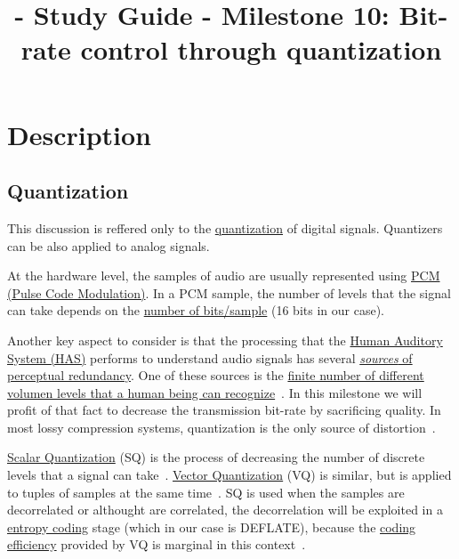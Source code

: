 
\title{\TM{} - Study Guide - Milestone 10: Bit-rate control through quantization}

\maketitle

\section{Description}

\subsection{Quantization}
This discussion is reffered only to the
\href{https://en.wikipedia.org/wiki/Quantization_(signal_processing)}{quantization}
of digital signals. Quantizers can be also applied to analog signals.

At the hardware level, the samples of audio are usually represented
using \href{https://en.wikipedia.org/wiki/Pulse-code_modulation}{PCM
  (Pulse Code Modulation)}. In a PCM sample, the number of levels that
the signal can take depends on the
\href{https://en.wikipedia.org/wiki/Audio_bit_depth}{number of
  bits/sample} (16 bits in our case).

Another key aspect to consider is that the processing that the
\href{https://en.wikipedia.org/wiki/Auditory_system}{Human Auditory
  System (HAS)} performs to understand audio signals has several
\href{https://en.wikipedia.org/wiki/Psychoacoustics}{\emph{sources} of
  perceptual redundancy}. One of these sources is the
\href{https://en.wikipedia.org/wiki/Equal-loudness_contour}{finite
  number of different volumen levels that a human being can
  recognize}~\cite{bosi2003intro}. In this milestone we will profit of
that fact to decrease the transmission bit-rate by sacrificing
quality.  In most lossy compression systems, quantization is the only
source of distortion~\cite{taubman2002jpeg2000}.

\href{https://en.wikipedia.org/wiki/Quantization_(signal_processing)}{Scalar
  Quantization} (SQ) is the process of decreasing the number of
discrete levels that a signal can
take~\cite{sayood2017introduction}. \href{https://en.wikipedia.org/wiki/Vector_quantization}{Vector
Quantization} (VQ) is similar, but is applied to tuples of samples at
the same time~\cite{vetterli2014foundations}. SQ is used when the
samples are decorrelated or althought are correlated, the decorrelation
will be exploited in
a \href{https://en.wikipedia.org/wiki/Entropy_encoding}{entropy
coding} stage (which in our case is DEFLATE), because the
\href{https://en.wikipedia.org/wiki/Quantization_(signal_processing)#Rate%E2%80%93distortion_optimization}{coding
  efficiency} provided by VQ is marginal in this
context~\cite{vetterli2014foundations}.

